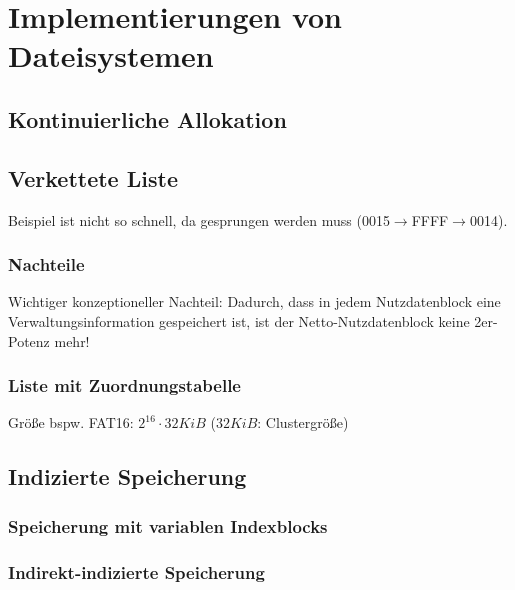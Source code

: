 
\section{Implementierungen von Dateisystemen}
\subsection{Kontinuierliche Allokation}

\subsection{Verkettete Liste}
Beispiel ist nicht so schnell, da gesprungen werden muss (0015$\to$FFFF$\to$0014).
\subsubsection{Nachteile}
Wichtiger konzeptioneller Nachteil: Dadurch, dass in jedem Nutzdatenblock eine Verwaltungsinformation gespeichert ist, ist der Netto-Nutzdatenblock keine 2er-Potenz mehr!
\subsubsection{Liste mit Zuordnungstabelle}
Größe bspw. FAT16: $2^{16}\cdot 32 \unit{KiB}$ ($32\unit{KiB}$: Clustergröße)

\subsection{Indizierte Speicherung}
\subsubsection{Speicherung mit variablen Indexblocks}
\subsubsection{Indirekt-indizierte Speicherung}


